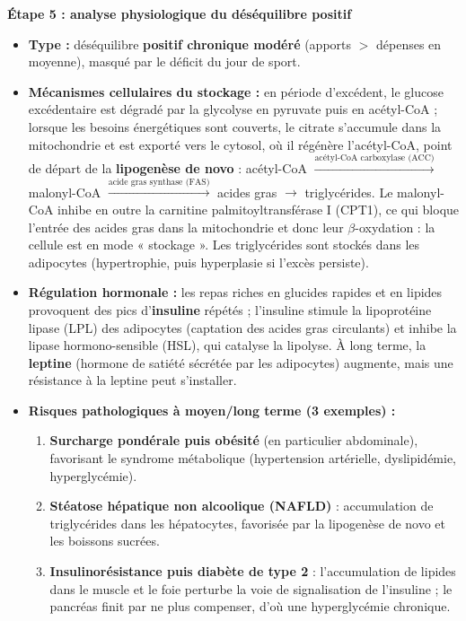 \documentclass[11pt]{article}
\begin{document}
\begin{exoresolu}
\textbf{Étape 5 : analyse physiologique du déséquilibre positif}
\begin{itemize}
    \item \textbf{Type :} déséquilibre \textbf{positif chronique modéré} (apports $>$ dépenses en moyenne), masqué par le déficit du jour de sport.
    \item \textbf{Mécanismes cellulaires du stockage :} en période d'excédent, le glucose excédentaire est dégradé par la glycolyse en pyruvate puis en acétyl-CoA ; lorsque les besoins énergétiques sont couverts, le citrate s'accumule dans la mitochondrie et est exporté vers le cytosol, où il régénère l'acétyl-CoA, point de départ de la \textbf{lipogenèse de novo} : acétyl-CoA $\xrightarrow{\text{acétyl-CoA carboxylase (ACC)}}$ malonyl-CoA $\xrightarrow{\text{acide gras synthase (FAS)}}$ acides gras $\rightarrow$ triglycérides. Le malonyl-CoA inhibe en outre la carnitine palmitoyltransférase I (CPT1), ce qui bloque l'entrée des acides gras dans la mitochondrie et donc leur $\beta$-oxydation : la cellule est en mode « stockage ». Les triglycérides sont stockés dans les adipocytes (hypertrophie, puis hyperplasie si l'excès persiste).
    \item \textbf{Régulation hormonale :} les repas riches en glucides rapides et en lipides provoquent des pics d'\textbf{insuline} répétés ; l'insuline stimule la lipoprotéine lipase (LPL) des adipocytes (captation des acides gras circulants) et inhibe la lipase hormono-sensible (HSL), qui catalyse la lipolyse. À long terme, la \textbf{leptine} (hormone de satiété sécrétée par les adipocytes) augmente, mais une résistance à la leptine peut s'installer.
    \item \textbf{Risques pathologiques à moyen/long terme (3 exemples) :}
    \begin{enumerate}
        \item \textbf{Surcharge pondérale puis obésité} (en particulier abdominale), favorisant le syndrome métabolique (hypertension artérielle, dyslipidémie, hyperglycémie).
        \item \textbf{Stéatose hépatique non alcoolique (NAFLD)} : accumulation de triglycérides dans les hépatocytes, favorisée par la lipogenèse de novo et les boissons sucrées.
        \item \textbf{Insulinorésistance puis diabète de type 2} : l'accumulation de lipides dans le muscle et le foie perturbe la voie de signalisation de l'insuline ; le pancréas finit par ne plus compenser, d'où une hyperglycémie chronique.
    \end{enumerate}
\end{itemize}


\end{exoresolu}
\end{document}
